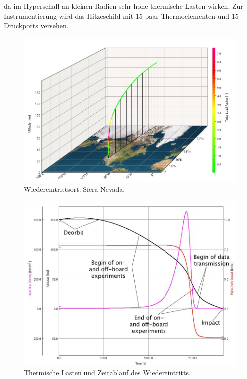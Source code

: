 \documentclass[twoside]{article}
\begin{document}
\begin{multicols}{2}
      da im Hyperschall an kleinen Radien sehr hohe thermische Lasten wirken.
      Zur Instrumentierung wird das Hitzeschild mit 15 paar Thermoelementen und 15
      Druckports versehen.    
      \begin{figure}[H]
         \captionsetup{format=plain}
         \centering
         \includegraphics[width=\linewidth]{ort.jpg}       
         \caption{Wiedereintrittsort: Siera Nevada.}
         \label{fig:enter}
      \end{figure}    
      \begin{figure}[H]
         \captionsetup{format=plain}
         \centering
         \includegraphics[width=0.8\linewidth]{astos.jpg}       
         \caption{Thermische Lasten und Zeitablauf des Wiedereintritts.}
         \label{fig:astos}
      \end{figure}    



\end{multicols}
\end{document}

